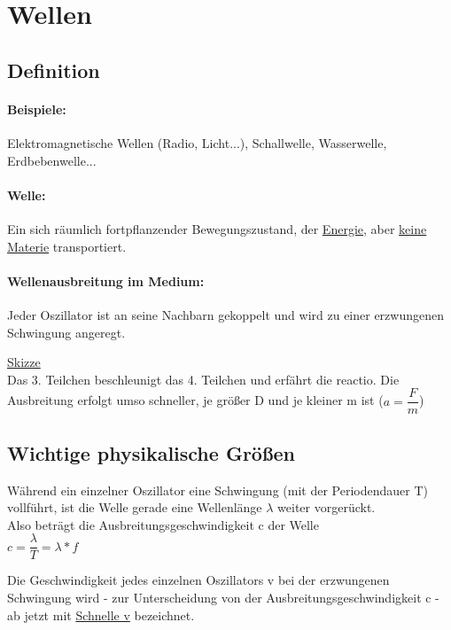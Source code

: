 \section{Wellen}
\subsection{Definition}
\paragraph{Beispiele:} Elektromagnetische Wellen (Radio, Licht...), Schallwelle, Wasserwelle, Erdbebenwelle... 

\paragraph{Welle:} 
Ein sich räumlich fortpflanzender Bewegungszustand, der \underline{Energie}, aber \underline{keine Materie} transportiert.

\paragraph{Wellenausbreitung im Medium:}
Jeder Oszillator ist an seine Nachbarn gekoppelt und wird zu einer erzwungenen Schwingung angeregt.

\vspace{2mm}
\underline{Skizze}\\
Das 3. Teilchen beschleunigt das 4. Teilchen und erfährt die reactio. Die Ausbreitung erfolgt umso schneller, je größer D und je kleiner m ist ($a = \dfrac{F}{m}$)

\subsection{Wichtige physikalische Größen}
Während ein einzelner Oszillator eine Schwingung (mit der Periodendauer T) vollführt, ist die Welle gerade eine Wellenlänge $\lambda$ weiter vorgerückt. \\
Also beträgt die Ausbreitungsgeschwindigkeit c der Welle
\vspace{2mm} \\
$ c = \dfrac{\lambda}{T} = \lambda \ast f $

\vspace{2mm}
Die Geschwindigkeit jedes einzelnen Oszillators v bei der erzwungenen Schwingung wird - zur Unterscheidung von der Ausbreitungsgeschwindigkeit c - ab jetzt mit \underline{Schnelle v} bezeichnet.
\vspace{2mm} \\
